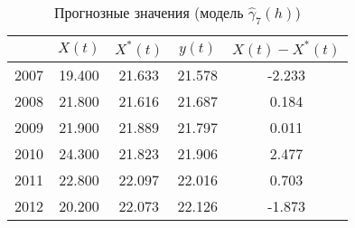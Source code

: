 \begin{table}[ht]
\centering
\caption{Прогнозные значения (модель $ \widehat{\gamma}_7(h) $)} 
\label{table:auto-class-20-prediction}
\begin{tabular}{r|cccc}
  \hline
 & $X(t)$ & $X^{*}(t)$ & $y(t)$ & $ X(t) - X^{*}(t) $ \\ 
  \hline
2007 & 19.400 & 21.633 & 21.578 & -2.233 \\ 
  2008 & 21.800 & 21.616 & 21.687 & 0.184 \\ 
  2009 & 21.900 & 21.889 & 21.797 & 0.011 \\ 
  2010 & 24.300 & 21.823 & 21.906 & 2.477 \\ 
  2011 & 22.800 & 22.097 & 22.016 & 0.703 \\ 
  2012 & 20.200 & 22.073 & 22.126 & -1.873 \\ 
   \hline
\end{tabular}
\end{table}
